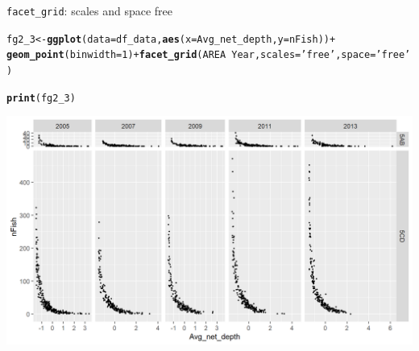 \documentclass{beamer}\usepackage[]{graphicx}\usepackage[]{color}
\makeatletter
\newcommand{\hlnum}[1]{\textcolor[rgb]{0.686,0.059,0.569}{#1}}%
\newcommand{\hlstr}[1]{\textcolor[rgb]{0.192,0.494,0.8}{#1}}%
\newcommand{\hlopt}[1]{\textcolor[rgb]{0,0,0}{#1}}%
\newcommand{\hlstd}[1]{\textcolor[rgb]{0.345,0.345,0.345}{#1}}%
\newcommand{\hlkwb}[1]{\textcolor[rgb]{0.69,0.353,0.396}{#1}}%
\newcommand{\hlkwc}[1]{\textcolor[rgb]{0.333,0.667,0.333}{#1}}%
\newcommand{\hlkwd}[1]{\textcolor[rgb]{0.737,0.353,0.396}{\textbf{#1}}}%
\newenvironment{kframe}{%
 \def\at@end@of@kframe{}%
 \ifinner\ifhmode%
  \def\at@end@of@kframe{\end{minipage}}%
  \begin{minipage}{\columnwidth}%
 \fi\fi%
 \def\FrameCommand##1{\hskip\@totalleftmargin \hskip-\fboxsep
 \colorbox{shadecolor}{##1}\hskip-\fboxsep
     \hskip-\linewidth \hskip-\@totalleftmargin \hskip\columnwidth}%
 \MakeFramed {\advance\hsize-\width
   \@totalleftmargin\z@ \linewidth\hsize
   \@setminipage}}%
 {\par\unskip\endMakeFramed%
 \at@end@of@kframe}
\newenvironment{knitrout}{}{} %
\makeatother
\begin{document}
\begin{frame}[fragile]{\lstinline{facet_grid}: scales and space free}
\begin{knitrout}\footnotesize
{}\color{fgcolor}\begin{kframe}
\begin{alltt}
\hlstd{fg2_3} \hlkwb{<-} \hlkwd{ggplot}\hlstd{(}\hlkwc{data}\hlstd{=df_data,} \hlkwd{aes}\hlstd{(}\hlkwc{x}\hlstd{=Avg_net_depth,} \hlkwc{y}\hlstd{=nFish))} \hlopt{+}
  \hlkwd{geom_point}\hlstd{(}\hlkwc{binwidth}\hlstd{=}\hlnum{1}\hlstd{)} \hlopt{+} \hlkwd{facet_grid}\hlstd{(AREA} \hlopt{~} \hlstd{Year,} \hlkwc{scales}\hlstd{=}\hlstr{'free'}\hlstd{,} \hlkwc{space} \hlstd{=} \hlstr{'free'}\hlstd{)}
\end{alltt}


{\ttfamily\noindent\bfseries\color{errorcolor}{\#\# Error: Unknown parameters: binwidth}}\begin{alltt}
\hlkwd{print}\hlstd{(fg2_3)}
\end{alltt}
\end{kframe}

{\centering \includegraphics[width=.9\linewidth]{figure/facet_grid_6-1} 

}



\end{knitrout}
\end{frame}
\end{document}

